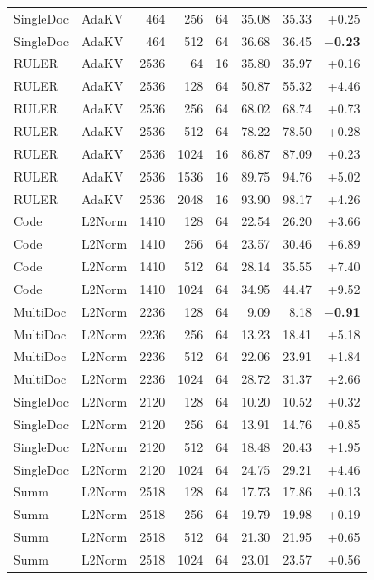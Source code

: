 \begin{table}[t]
\begin{tabular}{@{}l l r r r r r r@{}}
    SingleDoc & AdaKV & 464 & 256 & 64 & 35.08 & 35.33 & +0.25 \\
    SingleDoc & AdaKV & 464 & 512 & 64 & 36.68 & 36.45 & \textbf{$-$0.23} \\
    RULER & AdaKV & 2536 & 64 & 16 & 35.80 & 35.97 & +0.16 \\
    RULER & AdaKV & 2536 & 128 & 64 & 50.87 & 55.32 & +4.46 \\
    RULER & AdaKV & 2536 & 256 & 64 & 68.02 & 68.74 & +0.73 \\
    RULER & AdaKV & 2536 & 512 & 64 & 78.22 & 78.50 & +0.28 \\
    RULER & AdaKV & 2536 & 1024 & 16 & 86.87 & 87.09 & +0.23 \\
    RULER & AdaKV & 2536 & 1536 & 16 & 89.75 & 94.76 & +5.02 \\
    RULER & AdaKV & 2536 & 2048 & 16 & 93.90 & 98.17 & +4.26 \\
    Code & L2Norm & 1410 & 128 & 64 & 22.54 & 26.20 & +3.66 \\
    Code & L2Norm & 1410 & 256 & 64 & 23.57 & 30.46 & +6.89 \\
    Code & L2Norm & 1410 & 512 & 64 & 28.14 & 35.55 & +7.40 \\
    Code & L2Norm & 1410 & 1024 & 64 & 34.95 & 44.47 & +9.52 \\
    MultiDoc & L2Norm & 2236 & 128 & 64 & 9.09 & 8.18 & \textbf{$-$0.91} \\
    MultiDoc & L2Norm & 2236 & 256 & 64 & 13.23 & 18.41 & +5.18 \\
    MultiDoc & L2Norm & 2236 & 512 & 64 & 22.06 & 23.91 & +1.84 \\
    MultiDoc & L2Norm & 2236 & 1024 & 64 & 28.72 & 31.37 & +2.66 \\
    SingleDoc & L2Norm & 2120 & 128 & 64 & 10.20 & 10.52 & +0.32 \\
    SingleDoc & L2Norm & 2120 & 256 & 64 & 13.91 & 14.76 & +0.85 \\
    SingleDoc & L2Norm & 2120 & 512 & 64 & 18.48 & 20.43 & +1.95 \\
    SingleDoc & L2Norm & 2120 & 1024 & 64 & 24.75 & 29.21 & +4.46 \\
    Summ & L2Norm & 2518 & 128 & 64 & 17.73 & 17.86 & +0.13 \\
    Summ & L2Norm & 2518 & 256 & 64 & 19.79 & 19.98 & +0.19 \\
    Summ & L2Norm & 2518 & 512 & 64 & 21.30 & 21.95 & +0.65 \\
    Summ & L2Norm & 2518 & 1024 & 64 & 23.01 & 23.57 & +0.56 \\

\end{tabular}
\end{table}
